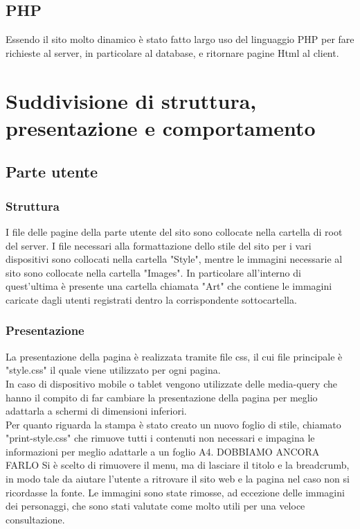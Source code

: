 \documentclass[openany, a4paper, 12pt]{report}
\begin{document}
		\subsection{PHP}
		Essendo il sito molto dinamico è stato fatto largo uso del linguaggio PHP per fare richieste al server, in particolare al database, e ritornare pagine Html al client.

	\section{Suddivisione di struttura, presentazione e comportamento}
		\subsection{Parte utente}
			\subsubsection{Struttura}
			I file delle pagine della parte utente del sito sono collocate nella cartella di root del server. I file necessari alla formattazione dello stile del sito per i vari dispositivi sono collocati nella cartella "Style", mentre le immagini necessarie al sito sono collocate nella cartella "Images". In particolare all'interno di quest'ultima è presente una cartella chiamata "Art" che contiene le immagini caricate dagli utenti registrati dentro la corrispondente sottocartella.
			\subsubsection{Presentazione}
			La presentazione della pagina è realizzata tramite file css, il cui file principale è "style.css" il quale viene utilizzato per ogni pagina.\\
			In caso di dispositivo mobile o tablet vengono utilizzate delle media-query che hanno il compito di far cambiare la presentazione della pagina per meglio adattarla a schermi di dimensioni inferiori.\\
			Per quanto riguarda la stampa è stato creato un nuovo foglio di stile, chiamato "print-style.css" che rimuove tutti i contenuti non necessari e impagina le informazioni per meglio adattarle a un foglio A4. 
		DOBBIAMO ANCORA FARLO Si è scelto di rimuovere il menu, ma di lasciare il titolo e la breadcrumb, in modo tale da aiutare l'utente a ritrovare il sito web e la pagina nel caso non si ricordasse la fonte. Le immagini sono state rimosse, ad eccezione delle immagini dei personaggi, che sono stati valutate come molto utili per una veloce consultazione.
\end{document}
